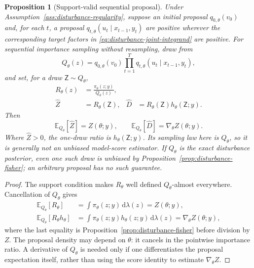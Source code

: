 \documentclass[11pt]{article}
\newtheorem{proposition}{Proposition}
\newcommand{\dd}{\mathrm{d}}
\begin{document}
\begin{proposition}[Support-valid sequential proposal]
\label{prop:disturbance-proposal}
Under Assumption~\ref{ass:disturbance-regularity}, suppose an initial
proposal $q_{0,\theta}(v_0)$ and, for each $t$, a proposal
$q_{t,\theta}(u_t\mid x_{t-1},y_t)$ are positive wherever the corresponding
target factors in \eqref{eq:disturbance-joint-integrand} are positive. For
sequential importance sampling without resampling, draw from
\begin{equation}
 Q_\theta(z)=q_{0,\theta}(v_0)\prod_{t=1}^T
 q_{t,\theta}(u_t\mid x_{t-1},y_t),
 \label{eq:disturbance-proposal-law}
\end{equation}
and set, for a draw $\mathsf Z\sim Q_\theta$,
\begin{align}
 R_\theta(z)&=\frac{\pi_\theta(z;y)}{Q_\theta(z)},\\
 \widehat Z&=R_\theta(\mathsf Z), &
 \widehat D&=R_\theta(\mathsf Z)h_\theta(\mathsf Z;y).
 \label{eq:disturbance-importance-pair}
\end{align}
Then
\begin{equation}
 \mathbb E_{Q_\theta}[\widehat Z]=Z(\theta;y),\qquad
 \mathbb E_{Q_\theta}[\widehat D]=\nabla_\theta Z(\theta;y).
 \label{eq:disturbance-importance-identities}
\end{equation}
Where $\widehat Z>0$, the one-draw ratio is
$h_\theta(\mathsf Z;y)$. Its sampling law here is $Q_\theta$, so it is
generally not an unbiased model-score estimator. If $Q_\theta$ is the exact
disturbance posterior, even one such draw is unbiased by
Proposition~\ref{prop:disturbance-fisher}; an arbitrary proposal has no such
guarantee.
\end{proposition}

\begin{proof}
The support condition makes $R_\theta$ well defined $Q_\theta$-almost
everywhere. Cancellation of $Q_\theta$ gives
\begin{align*}
 \mathbb E_{Q_\theta}[R_\theta]
 &=\int \pi_\theta(z;y)\,\dd\lambda(z)=Z(\theta;y),\\
 \mathbb E_{Q_\theta}[R_\theta h_\theta]
 &=\int \pi_\theta(z;y)h_\theta(z;y)\,\dd\lambda(z)
 =\nabla_\theta Z(\theta;y),
\end{align*}
where the last equality is Proposition~\ref{prop:disturbance-fisher} before
division by $Z$. The proposal density may depend on $\theta$: it cancels in
the pointwise importance ratio. A derivative of $Q_\theta$ is needed only if
one differentiates the proposal expectation itself, rather than using the
score identity to estimate $\nabla_\theta Z$.
\end{proof}
\end{document}
